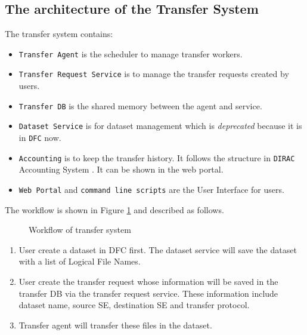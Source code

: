 \subsection{The architecture of the Transfer System}

The transfer system contains:

\begin{itemize}
    \item {\tt Transfer Agent} is the scheduler to manage transfer workers.
    \item {\tt Transfer Request Service} is to manage the transfer requests
          created by users.
    \item {\tt Transfer DB} is the shared memory between the agent and 
          service. 
    \item {\tt Dataset Service} is for dataset management which is 
          {\em deprecated} because it is in {\tt DFC} now.
    \item {\tt Accounting} is to keep the transfer history.
          It follows the structure in {\tt DIRAC} Accounting System
          \cite{bib:diracacct}.
          It can be shown in the web portal.
    \item {\tt Web Portal} and {\tt command line scripts} are the 
          User Interface for users.
\end{itemize}

The workflow is shown in Figure \ref{fig:workflow} and described as follows.
\begin{figure}[htbp]
    
    \caption{Workflow of transfer system} \label{fig:workflow}
\end{figure}

\begin{enumerate}
\item User create a dataset in DFC first. The dataset service
    will save the dataset with a list of Logical File Names.
\item User create the transfer request
whose information will be saved in the transfer DB via
the transfer request service. These information include
dataset name, source SE, destination SE and transfer protocol.
\item Transfer agent will transfer these files in the dataset.
\end{enumerate}

